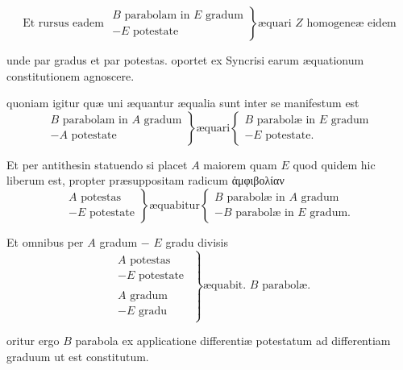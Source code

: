 \documentclass[11pt,a4paper]{article}
\begin{document}
\[ \text{Et rursus eadem } \left.\begin{array}{l} B \text{ parabolam in } E \text{ gradum} \\ - E \text{ potestate} \end{array}\right\} \text{æquari } Z \text{ homogeneæ eidem} \]

unde par \ill{} gradus et par potestas. oportet ex Syncrisi earum æquationum constitutionem agnoscere.

quoniam igitur quæ uni æquantur æqualia sunt inter se manifestum est
\[ \left.\begin{array}{l} B \text{ parabolam in } A \text{ gradum} \\ - A \text{ potestate} \end{array}\right\} \text{æquari} \left\{\begin{array}{l} B \text{ parabolæ in } E \text{ gradum} \\ - E \text{ potestate.} \end{array}\right. \]

Et per antithesin statuendo si placet $A$ maiorem quam $E$ quod quidem hic liberum est, propter præsuppositam radicum ἀμφιβολίαν
\[ \left.\begin{array}{l} A \text{ potestas} \\ - E \text{ potestate} \end{array}\right\} \text{æquabitur} \left\{\begin{array}{l} B \text{ parabolæ in } A \text{ gradum} \\ - B \text{ parabolæ in } E \text{ gradum.} \end{array}\right. \]

Et omnibus per $A$ gradum $-$ $E$ gradu divisis
\[ \left.\begin{array}{c} \begin{array}{l} A \text{ potestas} \\ - E \text{ potestate} \end{array} \\ \hline \begin{array}{l} A \text{ gradum} \\ - E \text{ gradu} \end{array} \end{array}\right\} \text{æquabit. } B \text{ parabolæ.} \]

oritur ergo $B$ parabola ex applicatione differentiæ potestatum ad differentiam graduum ut est constitutum.
\end{document}
